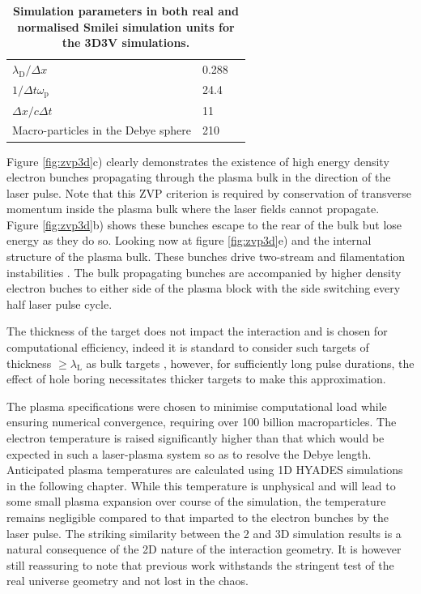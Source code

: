\begin{table}[]
\begin{center}
\begin{tabular}{lll}
		$\lambda_\mathrm{D}/\Delta x$                               &0.288                                   &  \\
		$1/\Delta t \omega_\mathrm{p}$                             &24.4                                   &  \\
		$\Delta x/c\Delta t$                             &   11                               &  \\
		Macro-particles in the Debye sphere                    &210                                  &  \vspace{0.15cm}\\ \hline \hline 

	\end{tabular}
	\end{center}
	\caption{\label{tab:parameters} \textbf{Simulation parameters in both real and normalised Smilei simulation units for the 3D3V simulations.} }
\end{table}
Figure \ref{fig:zvp3d}c) clearly demonstrates the existence of high energy density electron bunches propagating through the plasma bulk in the direction of the laser pulse. Note that this ZVP criterion is required by conservation of transverse momentum inside the plasma bulk where the laser fields cannot propagate. Figure \ref{fig:zvp3d}b) shows these bunches escape to the rear of the bulk but lose energy as they do so. Looking now at figure \ref{fig:zvp3d}e) and the internal structure of the plasma bulk. These bunches drive two-stream and filamentation instabilities \cite{bretMultidimensionalElectronBeamplasma2010}. The bulk propagating bunches are accompanied by higher density electron buches to either side of the plasma block with the side switching every half laser pulse cycle. 

The thickness of the target does not impact the interaction and is chosen for computational efficiency, indeed it is standard to consider such targets of thickness $\ge \lambda_\mathrm{L}$ as bulk targets \cite{dollarEnhancedLaserAbsorption2017}, however, for sufficiently long pulse durations, the effect of hole boring necessitates thicker targets to make this approximation.



The plasma specifications were chosen to minimise computational load while ensuring numerical convergence, requiring over 100 billion macroparticles. The electron temperature is raised significantly higher than that which would be expected in such a laser-plasma system so as to resolve the Debye length. Anticipated plasma temperatures are calculated using 1D HYADES simulations in the following chapter. While this temperature is unphysical and will lead to some small plasma expansion over course of the simulation, the temperature remains negligible compared to that imparted to the electron bunches by the laser pulse. The striking similarity between the 2 and 3D simulation results is a natural consequence of the 2D nature of the interaction geometry. It is however still reassuring to note that previous work withstands the stringent test of the real universe geometry and not lost in the chaos.

